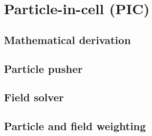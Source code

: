 \documentclass[12pt, twoside, a4paper, openright]{report}
\begin{document}
%

%

%

%

%


\chapter{Particle-in-cell (PIC)}


\section{Mathematical derivation}


\section{Particle pusher}


\section{Field solver}


\section{Particle and field weighting}

\end{document}
